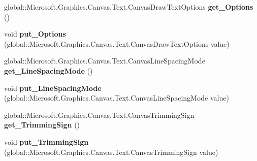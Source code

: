 \begin{DoxyCompactItemize}
\item 
\mbox{\label{interface_microsoft_1_1_graphics_1_1_canvas_1_1_text_1_1_i_canvas_text_layout_abcd9c95c3e186e366b308e9268aec7b3}} 
global\+::\+Microsoft.\+Graphics.\+Canvas.\+Text.\+Canvas\+Draw\+Text\+Options {\bfseries get\+\_\+\+Options} ()
\item 
\mbox{\label{interface_microsoft_1_1_graphics_1_1_canvas_1_1_text_1_1_i_canvas_text_layout_a2d49e25d90aae82a410bddfc947d5a20}} 
void {\bfseries put\+\_\+\+Options} (global\+::\+Microsoft.\+Graphics.\+Canvas.\+Text.\+Canvas\+Draw\+Text\+Options value)
\item 
\mbox{\label{interface_microsoft_1_1_graphics_1_1_canvas_1_1_text_1_1_i_canvas_text_layout_adf0a5326f22b270c50010a147728dbf0}} 
global\+::\+Microsoft.\+Graphics.\+Canvas.\+Text.\+Canvas\+Line\+Spacing\+Mode {\bfseries get\+\_\+\+Line\+Spacing\+Mode} ()
\item 
\mbox{\label{interface_microsoft_1_1_graphics_1_1_canvas_1_1_text_1_1_i_canvas_text_layout_a36fefc4917fac46be5776c84bed1b9de}} 
void {\bfseries put\+\_\+\+Line\+Spacing\+Mode} (global\+::\+Microsoft.\+Graphics.\+Canvas.\+Text.\+Canvas\+Line\+Spacing\+Mode value)
\item 
\mbox{\label{interface_microsoft_1_1_graphics_1_1_canvas_1_1_text_1_1_i_canvas_text_layout_aad4b6c408a3d13911d9e3f2963901bfe}} 
global\+::\+Microsoft.\+Graphics.\+Canvas.\+Text.\+Canvas\+Trimming\+Sign {\bfseries get\+\_\+\+Trimming\+Sign} ()
\item 
\mbox{\label{interface_microsoft_1_1_graphics_1_1_canvas_1_1_text_1_1_i_canvas_text_layout_a8c2b11a3188f814249a73e55f40fd37b}} 
void {\bfseries put\+\_\+\+Trimming\+Sign} (global\+::\+Microsoft.\+Graphics.\+Canvas.\+Text.\+Canvas\+Trimming\+Sign value)
\item 
\mbox{\label{interface_microsoft_1_1_graphics_1_1_canvas_1_1_text_1_1_i_canvas_text_layout_a78438d223733b9e461f4db23c339b79e}} 

\end{DoxyCompactItemize}
